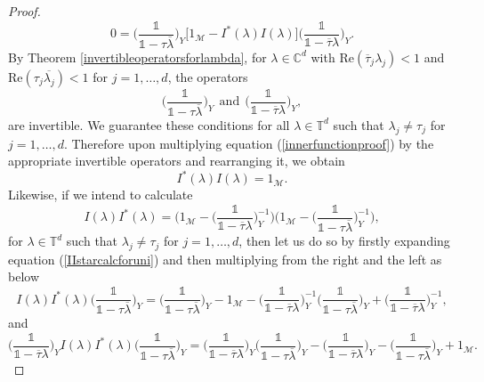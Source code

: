 \documentclass[11pt, reqno]{amsart}
\newcommand\1{\boldsymbol {1}}
\numberwithin{equation}{section}
\begin{document}
\begin{proof}
\begin{equation}\label{innerfunctionproof}
    0=\Big(\dfrac{\mathds{1}}{\mathds{1}-\tau\overline{\lambda}}\Big)_{Y}\Big[1_{\mathcal{M}}-I^{*}(\lambda)I(\lambda)\Big]\Big(\dfrac{\mathds{1}}{\mathds{1}-\overline{\tau}\lambda}\Big)_{Y}.
\end{equation}
By Theorem \ref{invertibleoperatorsforlambda}, for $\lambda\in\mathbb{C}^{d}$ with $\mathrm{Re}(\overline{\tau}_{j}\lambda_{j})<1$ and $\mathrm{Re}(\tau_{j}\overline{\lambda_{j}})<1$ for $j=1,\hdots,d$, the operators
$$\Big(\dfrac{\mathds{1}}{\mathds{1}-\tau\overline{\lambda}}\Big)_{Y}~~\text{and}~~\Big(\dfrac{\mathds{1}}{\mathds{1}-\overline{\tau}\lambda}\Big)_{Y},$$
are invertible. We guarantee these conditions for all $\lambda\in\mathbb{T}^{d}$ such that $\lambda_{j}\neq\tau_{j}$ for $j=1,\hdots, d$. Therefore upon multiplying equation (\ref{innerfunctionproof}) by the appropriate invertible operators and rearranging it, we obtain
\begin{equation}\label{IstarIfinalformula}
I^{*}(\lambda)I(\lambda) = 1_{\mathcal{M}}.
\end{equation}
Likewise, if we intend to calculate 
\begin{equation}\label{IIstarcalcforuni}
I(\lambda)I^{*}(\lambda) = \bigg(1_{\mathcal{M}}-\Big(\dfrac{\mathds{1}}{\mathds{1}-\overline{\tau}\lambda}\Big)^{-1}_{Y}\bigg)\bigg(1_{\mathcal{M}}-\Big(\dfrac{\mathds{1}}{\mathds{1}-\tau\overline{\lambda}}\Big)^{-1}_{Y}\bigg),
\end{equation}
for $\lambda\in\mathbb{T}^{d}$ such that $\lambda_{j}\neq \tau_{j}$ for $j=1,\hdots,d$, then let us do so by firstly expanding equation (\ref{IIstarcalcforuni}) and then multiplying from the right and the left as below
\begin{equation*}
    I(\lambda)I^{*}(\lambda)\bigg(\dfrac{\mathds{1}}{\mathds{1}-\tau\overline{\lambda}}\bigg)_{Y}=\big(\dfrac{\mathds{1}}{\mathds{1}-\tau\overline{\lambda}}\Big)_{Y}-1_{\mathcal{M}}-\Big(\dfrac{\mathds{1}}{\mathds{1}-\overline{\tau}\lambda}\Big)^{-1}_{Y}\Big(\dfrac{\mathds{1}}{\mathds{1}-\tau\overline{\lambda}}\Big)_{Y}+\Big(\dfrac{\mathds{1}}{\mathds{1}-\overline{\tau}\lambda}\Big)_{Y}^{-1},
\end{equation*}
and
\begin{equation*}
    \Big(\dfrac{\mathds{1}}{\mathds{1}-\overline{\tau}\lambda}\Big)_{Y}I(\lambda)I^{*}(\lambda)\bigg(\dfrac{\mathds{1}}{\mathds{1}-\tau\overline{\lambda}}\bigg)_{Y}
    =\Big(\dfrac{\mathds{1}}{\mathds{1}-\overline{\tau}\lambda}\Big)_{Y}\big(\dfrac{\mathds{1}}{\mathds{1}-\tau\overline{\lambda}}\Big)_{Y}-\Big(\dfrac{\mathds{1}}{\mathds{1}-\overline{\tau}\lambda}\Big)_{Y}-\Big(\dfrac{\mathds{1}}{\mathds{1}-\tau\overline{\lambda}}\Big)_{Y}+1_{\mathcal{M}}.

\end{equation*}
\end{proof}
\end{document}
